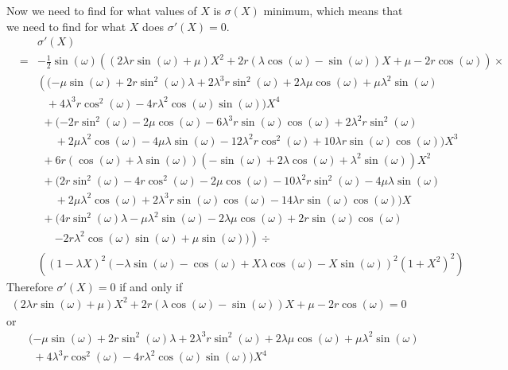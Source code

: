 \documentclass[11pt, oneside]{article}
\begin{document}
\begin{enumerate}
Now we need to find for what values
of $X$ is $\sigma(X)$ minimum,
which means that we need to find for what $X$
does $\sigma'(X)=0$.
\begin{eqnarray*}
&&\sigma'(X)\\
&=&-\frac{1}{2}\sin(\omega)\left((2\lambda r\sin(\omega)+\mu )X^2+2r(\lambda \cos(\omega)-\sin(\omega))X+\mu -2r\cos(\omega)\right)\times\\
&&\left((-\mu \sin(\omega)+2r\sin^2\!(\omega)\lambda +2\lambda^3r\sin^2\!(\omega)+2\lambda \mu \cos(\omega)+\mu \lambda^2\sin(\omega) \right.\\
&&\phantom{((}+4\lambda^3r\cos^2\!(\omega)-4r\lambda^2\cos(\omega)\sin(\omega)) X^4\\
&&\phantom{(}+(-2r\sin^2\!(\omega)-2\mu \cos(\omega)-6\lambda^3r\sin(\omega)\cos(\omega)+2\lambda^2r\sin^2\!(\omega)\\
&&\phantom{(+(}+2\mu \lambda^2\cos(\omega)-4\mu \lambda \sin(\omega)-12\lambda^2r\cos^2\!(\omega)+10\lambda r\sin(\omega)\cos(\omega))X^3\\
&&\phantom{(}+6r(\cos(\omega)+\lambda \sin(\omega))(-\sin(\omega)+2\lambda \cos(\omega)+\lambda^2\sin(\omega))X^2\\
&&\phantom{(}+(2r\sin^2\!(\omega)-4r\cos^2\!(\omega)-2\mu \cos(\omega)-10\lambda^2r\sin^2\!(\omega)-4\mu \lambda \sin(\omega)\\
&&\phantom{(+(}+2\mu \lambda^2\cos(\omega)+2\lambda^3r\sin(\omega)\cos(\omega)-14\lambda r\sin(\omega)\cos(\omega))X\\
&&\phantom{(}+(4r\sin^2\!(\omega)\lambda -\mu \lambda^2\sin(\omega)-2\lambda \mu \cos(\omega)+2r\sin(\omega)\cos(\omega)\\
&&\phantom{(+(}\left.-2r\lambda^2\cos(\omega)\sin(\omega)+\mu \sin(\omega))\right)\div\\
&&\left((1-\lambda X)^2(-\lambda \sin(\omega)-\cos(\omega)+X\lambda \cos(\omega)-X\sin(\omega))^2(1+X^2)^2\right)
\end{eqnarray*}
Therefore $\sigma'(X)=0$ if and only if
\begin{eqnarray}
\label{lemma arc fixed line minimal triangle equation 1}
(2\lambda r\sin(\omega)+\mu)X^2+2r(\lambda \cos(\omega)-\sin(\omega))X+\mu -2r\cos(\omega)=0
\end{eqnarray}
or
\begin{eqnarray}
\nonumber
&&(-\mu \sin(\omega)+2r\sin^2\!(\omega)\lambda +2\lambda^3r\sin^2\!(\omega)+2\lambda \mu \cos(\omega)+\mu \lambda^2\sin(\omega)\\
\nonumber
&&\phantom{(}+4\lambda^3r\cos^2\!(\omega)-4r\lambda^2\cos(\omega)\sin(\omega)) X^4\\

\end{eqnarray}
\end{enumerate}
\end{document}
